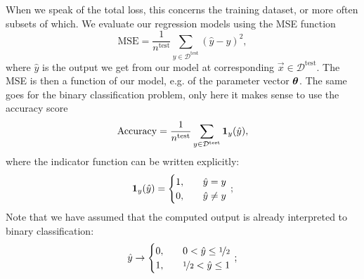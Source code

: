 When we speak of the total loss, this concerns the training dataset, or more often subsets of which. We evaluate our regression models using the MSE function
\begin{equation}\label{eq:MSE}
    \mathrm{MSE} = \frac{1}{n^\mathrm{test}} \sum_{y\in \mathcal{D}^\mathrm{test}} (\hat{y} - y)^2,
\end{equation}
where $\hat{y}$ is the output we get from our model at corresponding $\vec{x}\in\mathcal{D}^\mathrm{test}$. The MSE is then a function of our model, e.g. of the parameter vector $\boldsymbol{\theta}$. The same goes for the binary classification problem, only here it makes sense to use the accuracy score
\begin{equation}\label{eq:accuracy}
    \mathrm{Accuracy} = \frac{1}{n^\mathrm{test}} \sum_{y\in \mathcal{D}^\mathrm{test}} \boldsymbol{1}_{y}(\hat{y}),
\end{equation}
where the indicator function can be written explicitly:
\begin{equation}\label{eq:indicator}
    \boldsymbol{1}_y(\hat{y}) = \begin{cases}
        1, \quad & \hat{y} = y \\
        0, \quad & \hat{y} \neq y
    \end{cases}\, ;
\end{equation}
Note that we have assumed that the computed output is already interpreted to binary classification:
\begin{equation}\label{eq:binary_y}
    \hat{y} \to \begin{cases}
        0, \quad & 0 <\hat{y} \leq \nicefrac{1}{2} \\
        1, \quad & \nicefrac{1}{2} < \hat{y} \leq 1
    \end{cases}\, ;
\end{equation}
